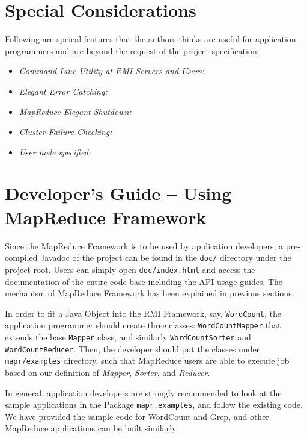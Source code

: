 \documentclass{article} %
\begin{document}
\section{Special Considerations}
\par\qquad Following are speical features that the authors thinks are useful for application programmers and are beyond the request of the project specification:

\begin{itemize}
    \item{\emph{Command Line Utility at RMI Servers and Users:}} 
    \item{\emph{Elegant Error Catching:}}
    \item{\emph{MapReduce Elegant Shutdown:}}
    \item{\emph{Cluster Failure Checking:}}
    \item{\emph{User node specified:}}
\end{itemize}

\section{Developer's Guide -- Using MapReduce Framework}

\par\qquad Since the MapReduce Framework is to be used by application developers, a pre-compiled Javadoc of the project can be found in the \texttt{doc/} directory under the project root. Users can simply open \texttt{doc/index.html} and access the documentation of the entire code base including the API usage guides. The mechanism of MapReduce Framework has been explained in previous sections.

\par\qquad In order to fit a Java Object into the RMI Framework, say, \texttt{WordCount}, the application programmer should create three classes: \texttt{WordCountMapper} that extends the base \texttt{Mapper} class, and similarly \texttt{WordCountSorter} and \texttt{WordCountReducer}. Then, the developer should put the classes under \texttt{mapr/examples} directory, such that MapReduce users are able to execute job based on our definition of \emph{Mapper}, \emph{Sorter}, and \emph{Reducer}.

\par\qquad In general, application developers are strongly recommended to look at the sample applications in the Package \texttt{mapr.examples}, and follow the existing code. We have provided the sample code for WordCount and Grep, and other MapReduce applications can be built similarly.
\end{document}
